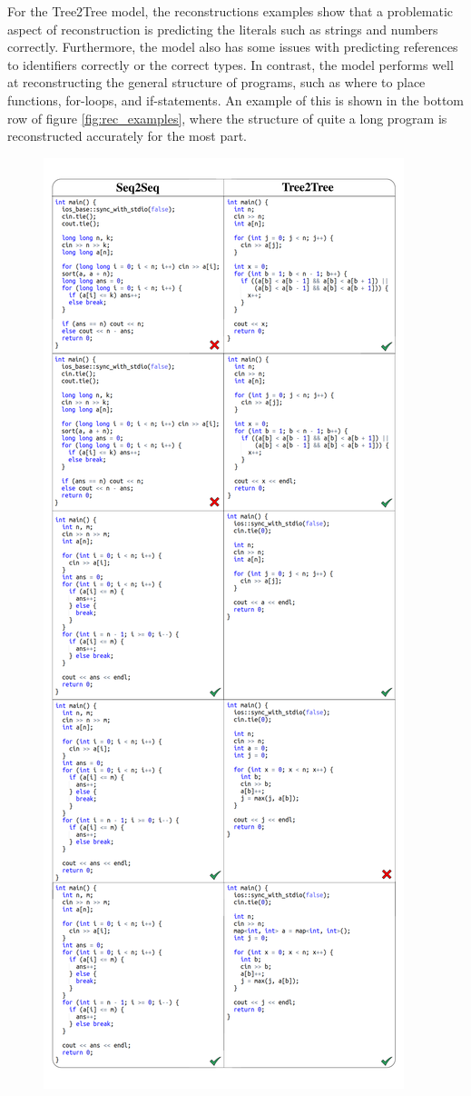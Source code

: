 For the Tree2Tree model, the reconstructions examples show that a problematic aspect of reconstruction is predicting the literals such as strings and numbers correctly. Furthermore, the model also has some issues with predicting references to identifiers correctly or the correct types. In contrast, the model performs well at reconstructing the general structure of programs, such as where to place functions, for-loops, and if-statements. An example of this is shown in the bottom row of figure \ref{fig:rec_examples}, where the structure of quite a long program is reconstructed accurately for the most part. 

\begin{figure}
    \centering
    \includegraphics[width=\textwidth,height=0.9\textheight,keepaspectratio]{images/Interpolations.pdf}

\end{figure}
